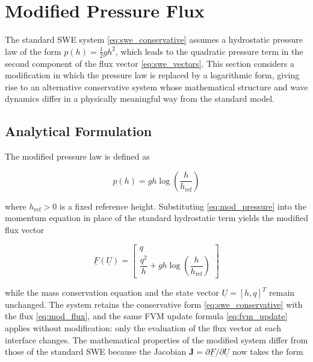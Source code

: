 
\section{Modified Pressure Flux}
\label{sc:33}

The standard SWE system \eqref{eq:swe_conservative} assumes a hydrostatic pressure law of the form \( p(h) = \tfrac{1}{2}gh^2 \), which leads to the quadratic pressure term in the second component of the flux vector \eqref{eq:swe_vectors}. This section considers a modification in which the pressure law is replaced by a logarithmic form, giving rise to an alternative conservative system whose mathematical structure and wave dynamics differ in a physically meaningful way from the standard model.

\subsection{Analytical Formulation}
\label{ssc:331}

The modified pressure law is defined as

\begin{equation}
p(h) = gh \log\left(\frac{h}{h_{\mathrm{ref}}}\right)
\label{eq:mod_pressure}
\end{equation}

where \( h_{\mathrm{ref}} > 0 \) is a fixed reference height. Substituting \eqref{eq:mod_pressure} into the momentum equation in place of the standard hydrostatic term yields the modified flux vector

\begin{equation}
\underline{F}(\underline{U}) =
\begin{bmatrix}
q \\
\dfrac{q^2}{h} + gh\log\left(\dfrac{h}{h_{\mathrm{ref}}}\right)
\end{bmatrix}
\label{eq:mod_flux}
\end{equation}

while the mass conservation equation and the state vector \( \underline{U} = [h, q]^T \) remain unchanged. The system retains the conservative form \eqref{eq:swe_conservative} with the flux \eqref{eq:mod_flux}, and the same FVM update formula \eqref{eq:fvm_update} applies without modification: only the evaluation of the flux vector at each interface changes. The mathematical properties of the modified system differ from those of the standard SWE because the Jacobian \( \mathbf{J} = \partial \underline{F} / \partial \underline{U} \) now takes the form

